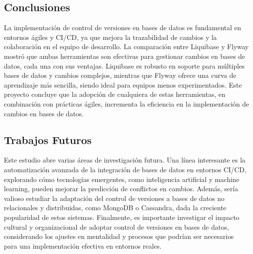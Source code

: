 \documentclass{IEEEtran}
\begin{document}
\subsection{Conclusiones}
La implementación de control de versiones en bases de datos es fundamental en entornos ágiles y CI/CD, ya que mejora la trazabilidad de cambios y la colaboración en el equipo de desarrollo. La comparación entre Liquibase y Flyway mostró que ambas herramientas son efectivas para gestionar cambios en bases de datos, cada una con sus ventajas. Liquibase es robusto en soporte para múltiples bases de datos y cambios complejos, mientras que Flyway ofrece una curva de aprendizaje más sencilla, siendo ideal para equipos menos experimentados. Este proyecto concluye que la adopción de cualquiera de estas herramientas, en combinación con prácticas ágiles, incrementa la eficiencia en la implementación de cambios en bases de datos.

\subsection{Trabajos Futuros}
Este estudio abre varias áreas de investigación futura. Una línea interesante es la automatización avanzada de la integración de bases de datos en entornos CI/CD, explorando cómo tecnologías emergentes, como inteligencia artificial y machine learning, pueden mejorar la predicción de conflictos en cambios. Además, sería valioso estudiar la adaptación del control de versiones a bases de datos no relacionales y distribuidas, como MongoDB o Cassandra, dada la creciente popularidad de estos sistemas. Finalmente, es importante investigar el impacto cultural y organizacional de adoptar control de versiones en bases de datos, considerando los ajustes en mentalidad y procesos que podrían ser necesarios para una implementación efectiva en entornos reales.


\renewcommand{\refname}{Referencias}
\nocite{}



    
\end{document}
